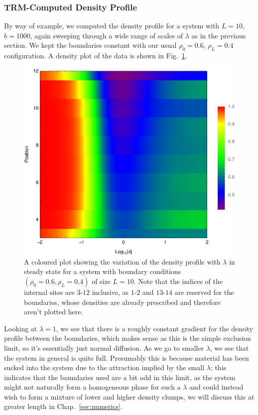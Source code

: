 \subsubsection{TRM-Computed Density Profile}
By way of example, we computed the density profile for a system with $L=10$, $b=1000$,
again sweeping through a wide range of scales of $\lambda$ as in the previous section.
We kept the boundaries constant with our usual $\rho_0 = 0.6$, $\rho_L = 0.4$
configuration. A density plot of the data is shown in Fig.~\ref{fig:analDensProf}.
 \begin{figure}[h!]
 \caption[The variation of the density profile with $\lambda$ for a system of size
 $L=12$ and boundaries $(\rho_0 = 0.6, \rho_L = 0.4)$.]{\label{fig:analDensProf} 
A coloured plot showing the variation of the density profile with $\lambda$ in steady state for a 
system with boundary conditions $(\rho_0 = 0.6, \rho_L = 0.4)$ of size $L=10$. Note 
that the indices of the internal sites are $3$-$12$ inclusive, as $1$-$2$ and 
$13$-$14$ are reserved for the boundaries, whose densities are already prescribed and therefore aren't plotted here.
 }
  
  \begin{center}
 \includegraphics[width=1.0\textwidth]{TRM/images/analMidDensProfile}
  \end{center}
\end{figure}
 Looking at $\lambda=1$, we see that there is a roughly constant gradient for the density profile between the
 boundaries, which makes sense as this is the simple exclusion limit, so it's essentially just normal
 diffusion.
 As we go to smaller $\lambda$, we see that the system in general is quite full. Presumably this is because
 material has been sucked into the system due to the attraction implied by the small $\lambda$; this
 indicates that the boundaries used are a bit odd in this limit, as the system might not naturally form
 a homogeneous phase for such a $\lambda$ and could instead wish to form a mixture of lower and 
 higher density clumps, we will discuss this at greater length in Chap.~\ref{sec:numerics}.
 
